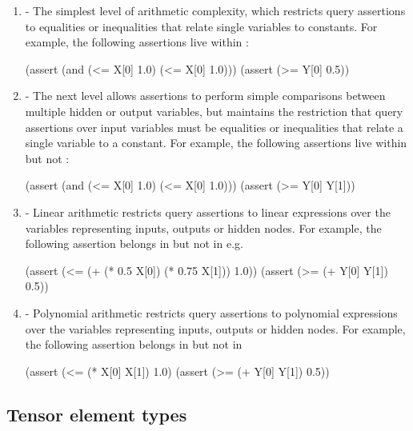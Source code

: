 \begin{enumerate}
\item \textbf{\bnd{}} - 
The simplest level of arithmetic complexity, which restricts query assertions to equalities or inequalities that relate single variables to constants. For example, the following assertions live within \bnd{}:

\begin{code}[style=lbnf]
(assert (and (<= X[0] 1.0) (<= X[0] 1.0)))
(assert (>= Y[0] 0.5))
\end{code}

\item \textbf{\cout{}} - 
The next level allows assertions to perform simple comparisons between multiple hidden or output variables, but maintains the restriction that query assertions over input variables must be equalities or inequalities that relate a single variable to a constant. For example, the following assertions live within \cout{} but not \bnd{}:

\begin{code}[style=lbnf]
(assert (and (<= X[0] 1.0) (<= X[0] 1.0)))
(assert (>= Y[0] Y[1]))
\end{code}

\item \textbf{\lin{}} - Linear arithmetic restricts query assertions to linear expressions over the variables representing inputs, outputs or hidden nodes. For example, the following assertion belongs in \lin{} but not in \cout{} e.g. 

\begin{code}[style=lbnf]
(assert (<= (+ (* 0.5 X[0]) (* 0.75 X[1])) 1.0))
(assert (>= (+ Y[0] Y[1]) 0.5))
\end{code}

\item \textbf{\poly{}} - Polynomial arithmetic restricts query assertions to polynomial expressions over the variables representing inputs, outputs or hidden nodes. 
For example, the following assertion belongs in \poly{} but not in \lin{}

\begin{code}[style=lbnf]
(assert (<= (* X[0] X[1]) 1.0)
(assert (>= (+ Y[0] Y[1]) 0.5))
\end{code}

\end{enumerate}


\subsection{Tensor element types}
\label{sec:element-types}

